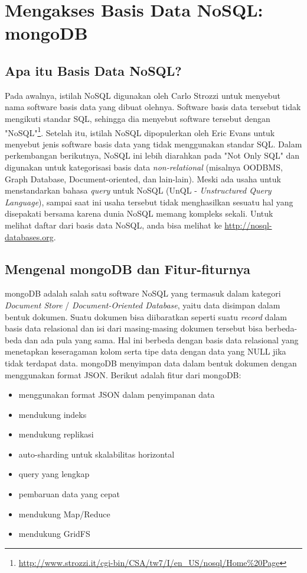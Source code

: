 \chapter{Mengakses Basis Data NoSQL: mongoDB}

\section{Apa itu Basis Data NoSQL?}

Pada awalnya, istilah NoSQL digunakan oleh Carlo Strozzi untuk menyebut nama software basis data yang dibuat olehnya. Software basis data tersebut tidak mengikuti standar SQL, sehingga dia menyebut software tersebut dengan "NoSQL"\footnote{\url{http://www.strozzi.it/cgi-bin/CSA/tw7/I/en_US/nosql/Home\%20Page}}. Setelah itu, istilah NoSQL dipopulerkan oleh Eric Evans untuk menyebut jenis software basis data yang tidak menggunakan standar SQL. Dalam perkembangan berikutnya, NoSQL ini lebih diarahkan pada "Not Only SQL" dan digunakan untuk kategorisasi basis data \textit{non-relational} (misalnya OODBMS, Graph Database, Document-oriented, dan lain-lain). Meski ada usaha untuk menstandarkan bahasa \textit{query} untuk NoSQL (UnQL - \textit{Unstructured Query Language}), sampai saat ini usaha tersebut tidak menghasilkan sesuatu hal yang disepakati bersama karena dunia NoSQL memang kompleks sekali. Untuk melihat daftar dari basis data NoSQL, anda bisa melihat ke \url{http://nosql-databases.org}.

\section{Mengenal mongoDB dan Fitur-fiturnya}

mongoDB adalah salah satu software NoSQL yang termasuk dalam kategori \textit{Document Store} / \textit{Document-Oriented Database}, yaitu data disimpan dalam bentuk dokumen. Suatu dokumen bisa diibaratkan seperti suatu \textit{record} dalam basis data relasional dan isi dari masing-masing dokumen tersebut bisa berbeda-beda dan ada pula yang sama. Hal ini berbeda dengan basis data relasional yang menetapkan keseragaman kolom serta tipe data dengan data yang NULL jika tidak terdapat data. mongoDB menyimpan data dalam bentuk dokumen dengan menggunakan format JSON. Berikut adalah fitur dari mongoDB:
\begin{itemize}
	\item menggunakan format JSON dalam penyimpanan data
	\item mendukung indeks
	\item mendukung replikasi
	\item auto-sharding untuk skalabilitas horizontal
	\item query yang lengkap
	\item pembaruan data yang cepat
	\item mendukung Map/Reduce
	\item mendukung GridFS
\end{itemize}

